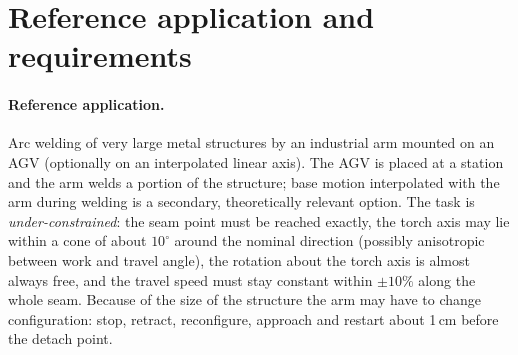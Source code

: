 \documentclass[10pt,a4paper]{article}
\begin{document}
\section{Reference application and requirements}\label{sec:app}
\paragraph{Reference application.} Arc welding of very large metal structures by an industrial arm mounted on an AGV (optionally on an interpolated linear axis). The AGV is placed at a station and the arm welds a portion of the structure; base motion interpolated with the arm during welding is a secondary, theoretically relevant option. The task is \emph{under-constrained}: the seam point must be reached exactly, the torch axis may lie within a cone of about $10^\circ$ around the nominal direction (possibly anisotropic between work and travel angle), the rotation about the torch axis is almost always free, and the travel speed must stay constant within $\pm10\%$ along the whole seam. Because of the size of the structure the arm may have to change configuration: stop, retract, reconfigure, approach and restart about 1\,cm before the detach point.
\end{document}
